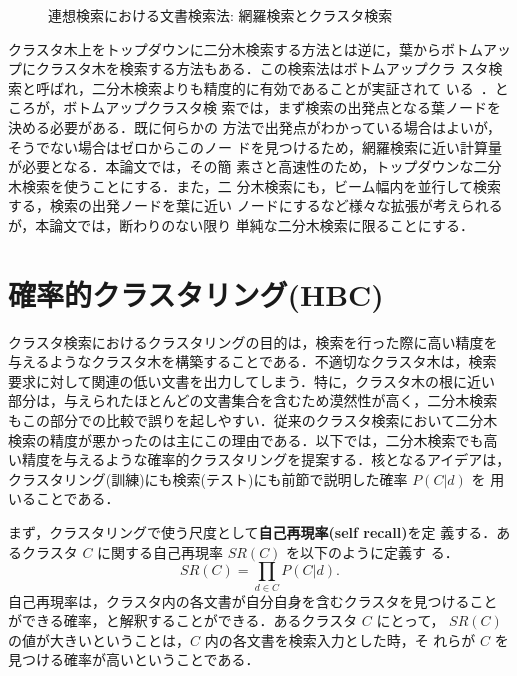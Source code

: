 \begin{figure*}
\begin{center}
\end{center}
\caption{連想検索における文書検索法: 網羅検索とクラスタ検索}
\label{fig:search_strategies}
\vspace{-2mm}
\end{figure*}

クラスタ木上をトップダウンに二分木検索する方法とは逆に，葉からボトムアッ
プにクラスタ木を検索する方法もある．この検索法は{\gt ボトムアップクラ
スタ検索}と呼ばれ，二分木検索よりも精度的に有効であることが実証されて
いる~\cite{croft:80:a,willett:88:a}．ところが，ボトムアップクラスタ検
索では，まず検索の出発点となる葉ノードを決める必要がある．既に何らかの
方法で出発点がわかっている場合はよいが，そうでない場合はゼロからこのノー
ドを見つけるため，網羅検索に近い計算量が必要となる．本論文では，その簡
素さと高速性のため，トップダウンな二分木検索を使うことにする．また，二
分木検索にも，ビーム幅内を並行して検索する，検索の出発ノードを葉に近い
ノードにするなど様々な拡張が考えられるが，本論文では，断わりのない限り
単純な二分木検索に限ることにする．

\section{確率的クラスタリング(HBC)}
\label{sec:hbc}

クラスタ検索におけるクラスタリングの目的は，検索を行った際に高い精度を
与えるようなクラスタ木を構築することである．不適切なクラスタ木は，検索
要求に対して関連の低い文書を出力してしまう．特に，クラスタ木の根に近い
部分は，与えられたほとんどの文書集合を含むため漠然性が高く，二分木検索
もこの部分での比較で誤りを起しやすい．従来のクラスタ検索において二分木
検索の精度が悪かったのは主にこの理由である．以下では，二分木検索でも高
い精度を与えるような確率的クラスタリングを提案する．核となるアイデアは，
クラスタリング(訓練)にも検索(テスト)にも前節で説明した確率 $P(C|d)$ を
用いることである．

まず，クラスタリングで使う尺度として{\gt\bf 自己再現率(self recall)}を定
義する．あるクラスタ $C$ に関する自己再現率 $SR(C)$ を以下のように定義す
る．
\begin{equation}
  SR(C) = \prod_{d \in C} P(C|d).
\end{equation}
自己再現率は，クラスタ内の各文書が自分自身を含むクラスタを見つけること
ができる確率，と解釈することができる．あるクラスタ $C$ にとって，
$SR(C)$ の値が大きいということは，$C$ 内の各文書を検索入力とした時，そ
れらが $C$ を見つける確率が高いということである．

